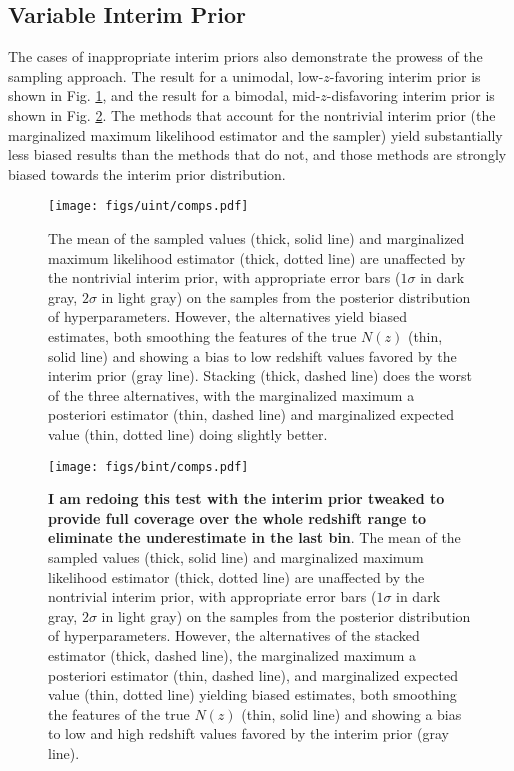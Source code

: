 \subsection{Variable Interim Prior}

The cases of inappropriate interim priors also demonstrate the prowess of the 
sampling approach.  The result for a unimodal, low-$z$-favoring interim prior 
is shown in Fig. \ref{fig:intu-comp}, and the result for a bimodal, 
mid-$z$-disfavoring interim prior is shown in Fig. \ref{fig:intb-comp}.  The 
methods that account for the nontrivial interim prior (the marginalized maximum 
likelihood estimator and the sampler) yield substantially less biased results 
than the methods that do not, and those methods are strongly biased towards the 
interim prior distribution.  

\begin{figure}
	\texttt{[image: figs/uint/comps.pdf]}
	\caption{The mean of the sampled values (thick, solid line) and marginalized 
		maximum likelihood estimator (thick, dotted line) are unaffected by the 
		nontrivial interim prior, with appropriate error bars ($1\sigma$ in dark gray, 
		$2\sigma$ in light gray) on the samples from the posterior distribution of 
		hyperparameters.  However, the alternatives yield biased estimates, both 
		smoothing the features of the true $N(z)$ (thin, solid line) and showing a bias 
		to low redshift values favored by the interim prior (gray line).  Stacking 
		(thick, dashed line) does the worst of the three alternatives, with the 
		marginalized maximum a posteriori estimator (thin, dashed line) and 
		marginalized expected value (thin, dotted line) doing slightly better.}
	\label{fig:intu-comp}
\end{figure}

\begin{figure}
	\texttt{[image: figs/bint/comps.pdf]}
	\caption{\textbf{I am redoing this test with the interim prior tweaked to 
			provide full coverage over the whole redshift range to eliminate the 
			underestimate in the last bin}.  The mean of the sampled values (thick, solid 
		line) and marginalized maximum likelihood estimator (thick, dotted line) are 
		unaffected by the nontrivial interim prior, with appropriate error bars 
		($1\sigma$ in dark gray, $2\sigma$ in light gray) on the samples from the 
		posterior distribution of hyperparameters.  However, the alternatives of the 
		stacked estimator (thick, dashed line), the marginalized maximum a posteriori 
		estimator (thin, dashed line), and marginalized expected value (thin, dotted 
		line) yielding biased estimates, both smoothing the features of the true $N(z)$ 
		(thin, solid line) and showing a bias to low and high redshift values favored 
		by the interim prior (gray line).}
	\label{fig:intb-comp}
\end{figure}

